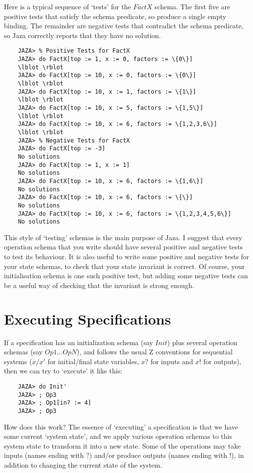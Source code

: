 \documentclass[11pt]{article}
\newcommand{\Jaza}{Jaza}
\begin{document}
Here is a typical sequence of `tests'
for the $FactX$ schema.  The first five are positive
tests that satisfy the schema predicate, so produce a
single empty binding.  The remainder are negative tests
that contradict the schema predicate, so {\Jaza} correctly
reports that they have no solution.
\begin{verbatim}
    JAZA> % Positive Tests for FactX
    JAZA> do FactX[top := 1, x := 0, factors := \{0\}]
    \lblot \rblot
    JAZA> do FactX[top := 10, x := 0, factors := \{0\}]
    \lblot \rblot
    JAZA> do FactX[top := 10, x := 1, factors := \{1\}]
    \lblot \rblot
    JAZA> do FactX[top := 10, x := 5, factors := \{1,5\}]
    \lblot \rblot
    JAZA> do FactX[top := 10, x := 6, factors := \{1,2,3,6\}]
    \lblot \rblot
    JAZA> % Negative Tests for FactX
    JAZA> do FactX[top := -3]
    No solutions
    JAZA> do FactX[top := 1, x := 1]
    No solutions
    JAZA> do FactX[top := 10, x := 6, factors := \{1,6\}]
    No solutions
    JAZA> do FactX[top := 10, x := 6, factors := \{\}]
    No solutions
    JAZA> do FactX[top := 10, x := 6, factors := \{1,2,3,4,5,6\}]
    No solutions
\end{verbatim}

This style of `testing' schemas is the main purpose of {\Jaza}.
I suggest that every operation schema that you write should have several
positive and negative tests to test its behaviour.  It is
also useful to write some positive and negative tests for your
state schemas, to check that your state invariant is correct.
Of course, your initialisation schema is one such positive test,
but adding some negative tests can be a useful way of checking that the
invariant is strong enough.


\section{Executing Specifications}
\label{sec:execute}

If a specification has an initialization schema (say $Init$) plus
several operation schemas (say $Op1 \ldots OpN$), and
follows the usual Z conventions for sequential systems 
($x/x'$ for initial/final state variables, $x?$ for inputs and $x!$
for outputs), then we can try to `execute' it like this:
\begin{verbatim}
    JAZA> do Init'
    JAZA> ; Op3
    JAZA> ; Op1[in? := 4]
    JAZA> ; Op3
\end{verbatim}

How does this work?  
The essence of `executing' a specification is that we have some
current `system state', and we apply various operation schemas to this
system state to transform it into a new state.  Some of the operations
may take inputs (names ending with $?$) and/or produce outputs (names
ending with $!$), in addition to changing the current state of the system.
\end{document}
